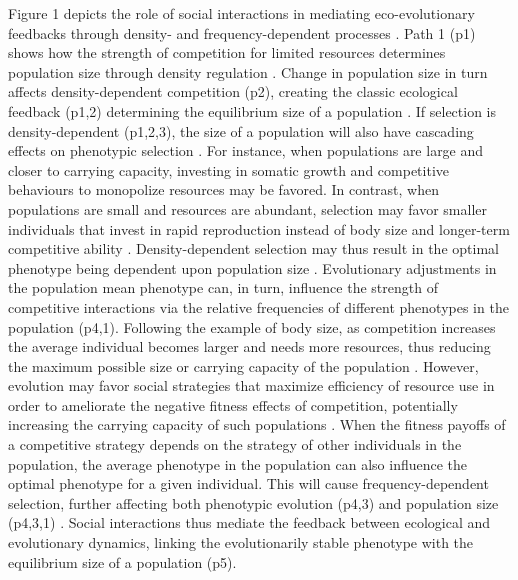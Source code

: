 \documentclass{article}
\begin{document}
 Figure 1 depicts the role of social interactions in mediating eco-evolutionary feedbacks through density- and frequency-dependent processes \citep{Engen2020}. Path 1 (p1) shows how the strength of competition for limited resources determines population size through density regulation \citep{Gilpin1973a}. Change in population size in turn affects density-dependent competition (p2), creating the classic ecological feedback (p1,2) determining the equilibrium size of a population \citep{Travis2013}. If selection is density-dependent (p1,2,3), the size of a population will also have cascading effects on phenotypic selection  \citep{Mueller1997, Boyce1984}. For instance, when populations are large and closer to carrying capacity, investing in somatic growth and competitive behaviours to monopolize resources may be favored. In contrast, when populations are small and resources are abundant, selection may favor smaller individuals that invest in rapid reproduction instead of body size and longer-term competitive ability \citep{Joshi2001, Wright2018, Engen2017}. Density-dependent selection may thus result in the optimal phenotype being dependent upon population size \citep{Anderson1971, Charlesworth1971}. Evolutionary adjustments in the population mean phenotype can, in turn, influence the strength of competitive interactions via the relative frequencies of different phenotypes in the population \citep{Wright1969} (p4,1). Following the example of body size, as competition increases the average individual becomes larger and needs more resources, thus reducing the maximum possible size or carrying capacity of the population \citep{Engen2020}. However, evolution may favor social strategies that maximize efficiency of resource use in order to ameliorate the negative fitness effects of competition, potentially increasing the carrying capacity of such populations \citep{macarthur1967theory,  Boyce1984}. When the fitness payoffs of a competitive strategy depends on the strategy of other individuals in the population, the average phenotype in the population can also influence the optimal phenotype for a given individual. This will cause frequency-dependent selection, further affecting both phenotypic evolution (p4,3) \citep{Heino1998} and population size (p4,3,1) \citep{Svensson2018}. Social interactions thus mediate the feedback between ecological and evolutionary dynamics, linking the evolutionarily stable phenotype with the equilibrium size of a population (p5).
\end{document}

